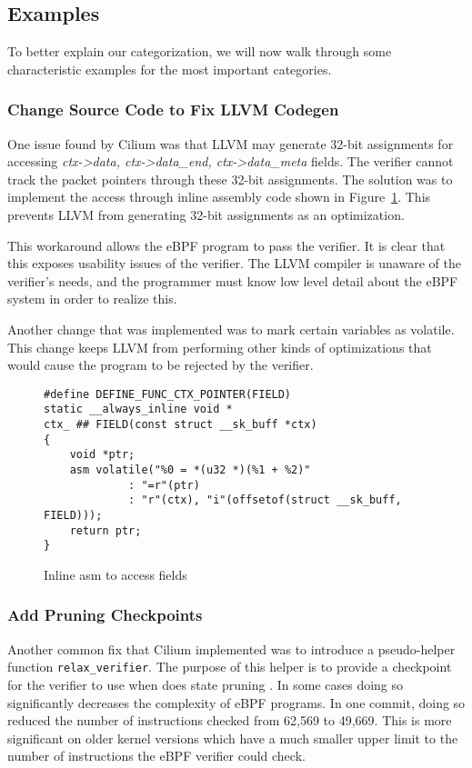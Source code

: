 \subsection{Examples}
To better explain our categorization, we will now walk through some characteristic examples for the most important categories.

\subsubsection{Change Source Code to Fix LLVM Codegen}
One issue found by Cilium was that LLVM may generate 32-bit assignments for accessing \emph{ctx->data, ctx->data\_end, ctx->data\_meta} fields.
The verifier cannot track the packet pointers through these 32-bit assignments.
The solution was to implement the access through inline assembly code shown in Figure~\ref{fig:inline-asm}.
This prevents LLVM from generating 32-bit assignments as an optimization.



This workaround allows the eBPF program to pass the verifier.
It is clear that this exposes usability issues of the verifier.
The LLVM compiler is unaware of the verifier's needs, and the programmer must know low level detail about the eBPF system in order to realize this.

Another change that was implemented was to mark certain variables as volatile.
This change keeps LLVM from performing other kinds of optimizations that would cause the program to be rejected by the verifier.

\begin{figure}
    \begin{lstlisting}[language=myC]
#define DEFINE_FUNC_CTX_POINTER(FIELD)
static __always_inline void *
ctx_ ## FIELD(const struct __sk_buff *ctx)
{
	void *ptr;
	asm volatile("%0 = *(u32 *)(%1 + %2)"
		     : "=r"(ptr)
		     : "r"(ctx), "i"(offsetof(struct __sk_buff, FIELD)));
	return ptr;
}
    \end{lstlisting}
    \caption{Inline asm to access fields}
    \label{fig:inline-asm}
\end{figure}

\subsubsection{Add Pruning Checkpoints}
Another common fix that Cilium implemented was to introduce a pseudo-helper function \texttt{relax\_verifier}.
The purpose of this helper is to provide a checkpoint for the verifier to use when does state pruning
.
In some cases doing so significantly decreases the complexity of eBPF programs.
In one commit, doing so reduced the number of instructions checked from 62,569 to 49,669.
This is more significant on older kernel versions which have a much smaller upper limit to the number of instructions the eBPF verifier could check.

